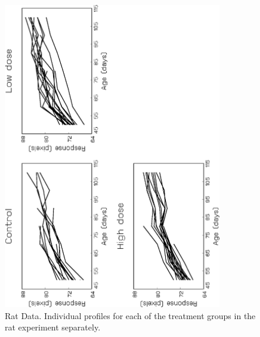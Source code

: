 \documentclass[useAMS,usenatbib,referee]{biom}
\begin{document}
\begin{figure}
\begin{center}
\centerline{\includegraphics[width=3.75in,angle=270]{tteken21.eps}}
\end{center}
\caption{Rat Data. Individual profiles for each of the treatment
groups in the rat experiment separately. \label{figuretwo}}
\end{figure}
\end{document}
